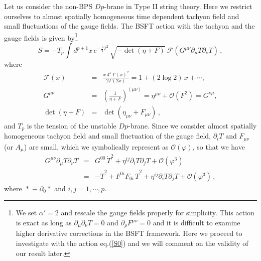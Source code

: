 \documentclass[12pt,a4paper]{article}
\newcommand{\p}{\partial}
\newcommand{\F}{\mathcal{F}}
\newcommand{\VT}{e^{-\frac{1}{4} T^2}}
\newcommand{\intdx}{\int d^{p+1}x}
\newcommand{\nn}{\nonumber\\}
\newcommand{\calO}{\mathcal{O}}
\begin{document}
Let us consider the non-BPS $Dp$-brane in Type II string theory.
Here we restrict ourselves to almost spatially homogeneous time
dependent tachyon field and small fluctuations of the gauge fields.
The BSFT action with the tachyon and the gauge fields is given
by\footnote{We set $\alpha'=2$ and rescale the gauge fields properly
for simplicity. This action is exact as long as $\p_\mu \p_\nu T=0$
and $\p_\rho F^{\mu\nu}=0$ and it is difficult
to examine higher derivative corrections in the BSFT framework.
Here we proceed to investigate with the action eq.(\ref{S0}) and
we will comment on the validity of our result later.}
\cite{TU,KMM2,An}
\begin{equation}
 S=-T_p \intdx\, \VT\, \sqrt{-\det (\eta +F)}~\F
	(G^{\mu\nu} \p_\mu T \p_\nu T)\,,\label{S0}
\end{equation}
where
\begin{eqnarray}
 \F(x)&=&\frac{x\,4^x\, \Gamma(x)^2}{2\Gamma(2x)}
	=1+(2\log2)\,x+\cdots, \\
 G^{\mu\nu}&=&\left( \frac{1}{\eta +F} \right)^{(\mu\nu)}
	= \eta^{\mu\nu}+\calO (F^2) =G^{\nu\mu}, \\
 \det(\eta+F)&=&\det(\eta_{\mu\nu}+F_{\mu\nu})\,,
\end{eqnarray}
and  $T_p$ is the tension of the unstable $Dp$-brane.
Since we consider almost spatially homogeneous tachyon field and small
fluctuation of the gauge field, $\p_i T$ and $F_{\mu\nu}$ (or $A_\mu$)
are small, which we symbolically represent as $\calO(\varphi)$, so
that we have
\begin{eqnarray}
   G^{\mu\nu}\p_\mu T \p_\nu T &=&
	G^{00}\,\dot{T}^2 + \eta^{ij}\p_i T \p_j T
	+\calO(\varphi^3)\nn
  &=&  -\dot{T}^2 + F^{0i}F_{0i}\,\dot{T}^2 + \eta^{ij}\p_i T \p_j T
	+\calO(\varphi^3)\,,\label{eq:GTTexp}
\end{eqnarray}
where $\dot{*}\equiv\p_0 *$ and $i,j=1,\cdots ,p$.
\end{document}
